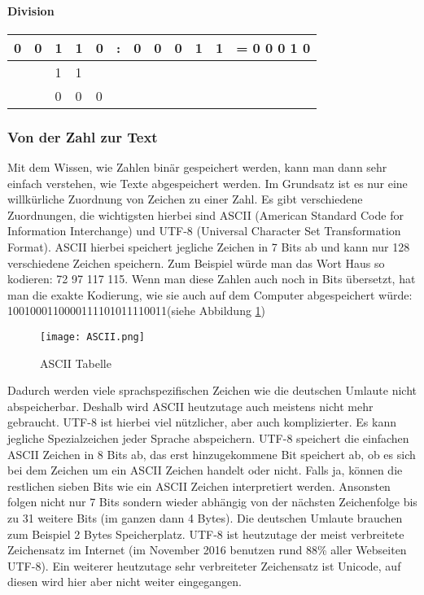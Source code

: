 \paragraph{Division}


\begin{tabular}{lllllllllll l}


0&0&1&1&0& : &0&0&0&1&1 & = 0 0 0 1 0 \\ \hline


& &1&1& & &&&&&& \\ \cline{3-4}


& &0&0&0& &&&&&& \\


\end{tabular}


\subsubsection{Von der Zahl zur Text}


Mit dem Wissen, wie Zahlen binär gespeichert werden, kann man dann sehr einfach verstehen, wie Texte abgespeichert werden. Im Grundsatz ist es nur eine willkürliche Zuordnung von Zeichen zu einer Zahl. Es gibt verschiedene Zuordnungen, die wichtigsten hierbei sind ASCII (American Standard Code for Information Interchange) und UTF-8 (Universal Character Set Transformation Format). ASCII hierbei speichert jegliche Zeichen in 7 Bits ab und kann nur 128 verschiedene Zeichen speichern. Zum Beispiel würde man das Wort Haus so kodieren: 72 97 117 115. Wenn man diese Zahlen auch noch in Bits übersetzt, hat man die exakte Kodierung, wie sie auch auf dem Computer abgespeichert würde: 1001000110000111101011110011(siehe Abbildung \ref{fig:ASCII})


\begin{figure}[htbp]


 \centering


    \texttt{[image: ASCII.png]}


 \caption{ASCII Tabelle \cite{ASCII}}


 \label{fig:ASCII}


\end{figure}


Dadurch werden viele sprachspezifischen Zeichen wie die deutschen Umlaute nicht abspeicherbar. Deshalb wird ASCII heutzutage auch meistens nicht mehr gebraucht. UTF-8 ist hierbei viel nützlicher, aber auch komplizierter. Es kann jegliche Spezialzeichen jeder Sprache abspeichern. UTF-8 speichert die einfachen ASCII Zeichen in 8 Bits ab, das erst hinzugekommene Bit speichert ab, ob es sich bei dem Zeichen um ein ASCII Zeichen handelt oder nicht. Falls ja, können die restlichen sieben Bits wie ein ASCII Zeichen interpretiert werden. Ansonsten folgen nicht nur 7 Bits sondern wieder abhängig von der nächsten Zeichenfolge bis zu 31 weitere Bits (im ganzen dann 4 Bytes). Die deutschen Umlaute brauchen zum Beispiel 2 Bytes Speicherplatz. UTF-8 ist heutzutage der meist verbreitete Zeichensatz im Internet (im November 2016 benutzen rund 88\% aller Webseiten UTF-8). \cite{UTF-8} Ein weiterer heutzutage sehr verbreiteter Zeichensatz ist Unicode, auf diesen wird hier aber nicht weiter eingegangen.


